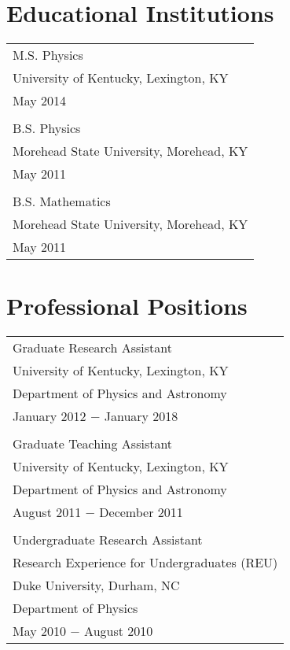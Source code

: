 \documentclass[final]{ukthesis}
\begin{document}
\section*{Educational Institutions}
\begin{tabular} {l}
  M.S. Physics    \\ University of Kentucky, Lexington, KY   \\May 2014 \\ \\
  B.S. Physics    \\ Morehead State University, Morehead, KY \\May 2011 \\ \\
  B.S. Mathematics\\ Morehead State University, Morehead, KY \\May 2011
\end{tabular}

\section*{Professional Positions}
\begin{tabular} {l}
  Graduate Research Assistant \\University of Kentucky, Lexington, KY \\
  Department of Physics and Astronomy\\
  January 2012 $-$ January 2018 \\
  \\
  Graduate Teaching Assistant \\University of Kentucky, Lexington, KY \\
  Department of Physics and Astronomy \\
  August 2011 $-$ December 2011 \\
  \\
  Undergraduate Research Assistant\\
  Research Experience for Undergraduates (REU)\\
  Duke University, Durham, NC \\
  Department of Physics \\
  May 2010 $-$ August 2010
 
\end{tabular}
\end{document}
